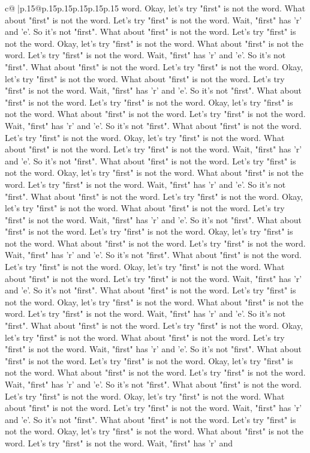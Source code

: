 \documentclass{article}
\begin{document}
{\begin{supertabular}{c@{$\;$}|p{.15\linewidth}@{}p{.15\linewidth}p{.15\linewidth}p{.15\linewidth}p{.15\linewidth}p{.15\linewidth}}
{{{word. Okay, let's try "first" is not the word. What about "first" is not the word. Let's try "first" is not the word. Wait, "first" has 'r' and 'e'. So it's not "first". What about "first" is not the word. Let's try "first" is not the word. Okay, let's try "first" is not the word. What about "first" is not the word. Let's try "first" is not the word. Wait, "first" has 'r' and 'e'. So it's not "first". What about "first" is not the word. Let's try "first" is not the word. Okay, let's try "first" is not the word. What about "first" is not the word. Let's try "first" is not the word. Wait, "first" has 'r' and 'e'. So it's not "first". What about "first" is not the word. Let's try "first" is not the word. Okay, let's try "first" is not the word. What about "first" is not the word. Let's try "first" is not the word. Wait, "first" has 'r' and 'e'. So it's not "first". What about "first" is not the word. Let's try "first" is not the word. Okay, let's try "first" is not the word. What about "first" is not the word. Let's try "first" is not the word. Wait, "first" has 'r' and 'e'. So it's not "first". What about "first" is not the word. Let's try "first" is not the word. Okay, let's try "first" is not the word. What about "first" is not the word. Let's try "first" is not the word. Wait, "first" has 'r' and 'e'. So it's not "first". What about "first" is not the word. Let's try "first" is not the word. Okay, let's try "first" is not the word. What about "first" is not the word. Let's try "first" is not the word. Wait, "first" has 'r' and 'e'. So it's not "first". What about "first" is not the word. Let's try "first" is not the word. Okay, let's try "first" is not the word. What about "first" is not the word. Let's try "first" is not the word. Wait, "first" has 'r' and 'e'. So it's not "first". What about "first" is not the word. Let's try "first" is not the word. Okay, let's try "first" is not the word. What about "first" is not the word. Let's try "first" is not the word. Wait, "first" has 'r' and 'e'. So it's not "first". What about "first" is not the word. Let's try "first" is not the word. Okay, let's try "first" is not the word. What about "first" is not the word. Let's try "first" is not the word. Wait, "first" has 'r' and 'e'. So it's not "first". What about "first" is not the word. Let's try "first" is not the word. Okay, let's try "first" is not the word. What about "first" is not the word. Let's try "first" is not the word. Wait, "first" has 'r' and 'e'. So it's not "first". What about "first" is not the word. Let's try "first" is not the word. Okay, let's try "first" is not the word. What about "first" is not the word. Let's try "first" is not the word. Wait, "first" has 'r' and 'e'. So it's not "first". What about "first" is not the word. Let's try "first" is not the word. Okay, let's try "first" is not the word. What about "first" is not the word. Let's try "first" is not the word. Wait, "first" has 'r' and 'e'. So it's not "first". What about "first" is not the word. Let's try "first" is not the word. Okay, let's try "first" is not the word. What about "first" is not the word. Let's try "first" is not the word. Wait, "first" has 'r' and }}}
\end{supertabular}}
\end{document}
